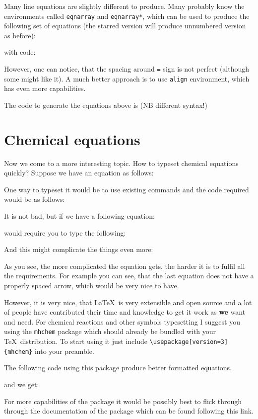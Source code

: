 \documentclass[a4paper,11pt]{article}
\begin{document}
Many line equations are slightly different to produce. Many probably know the
environments called \verb|eqnarray| and \verb|eqnarray*|, which can be used to
produce the following set of equations (the starred version will produce
unnumbered version as before):

with code:


However, one can notice, that the spacing around \verb|=| sign is not perfect
(although some might like it). A much better approach is to use \verb|align|
environment, which has even more capabilities.

The code to generate the equations above is (NB different syntax!)


\section{Chemical equations}

Now we come to a more interesting topic. How to typeset chemical equations
quickly? Suppose we have an equation as follows:


One way to typeset it would be to use existing commands and the code required
would be as follows:


It is not bad, but if we have a following equation:

would require you to type the following:


And this might complicate the things even more:



As you see, the more complicated the equation gets, the harder it is to fulfil
all the requirements. For example you can see, that the last equation does not
have a properly spaced arrow, which would be very nice to have.

However, it is very nice, that \LaTeX\ is very extensible and open source and
a lot of people have contributed their time and knowledge to get it work as
\textbf{we} want and need. For chemical reactions and other symbols typesetting
I suggest you using the \verb|mhchem| package which should already be bundled with your
\TeX\ distribution. To start using it just include
\verb|\usepackage[version=3]{mhchem}| into your preamble.

The following code using this package produce better formatted equations.

and we get:


For more capabilities of the package it would be possibly best to flick through
through the documentation of the package which can be found following this link.
\end{document}
